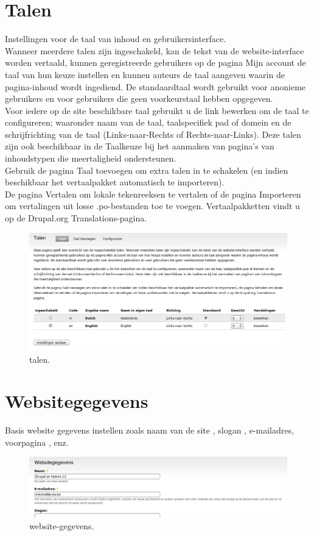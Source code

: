 \section{Talen} 
    Instellingen voor de taal van inhoud en gebruikersinterface. \\
Wanneer meerdere talen zijn 
ingeschakeld, kan de tekst van de website-interface worden vertaald, kunnen geregistreerde 
gebruikers op de pagina Mijn account de taal van hun keuze instellen en kunnen auteurs de 
taal aangeven waarin de pagina-inhoud wordt ingediend. De standaardtaal wordt gebruikt voor 
anonieme gebruikers en voor gebruikers die geen voorkeurstaal hebben opgegeven.
\\
Voor iedere op de site beschikbare taal gebruikt u de link bewerken om de taal te configureren; 
waaronder naam van de taal, taalspecifiek pad of domein en de schrijfrichting van de 
taal (Links-naar-Rechts of Rechts-naar-Links). Deze talen zijn ook beschikbaar in de 
Taalkeuze bij het aanmaken van pagina's van inhoudstypen die meertaligheid ondersteunen.
\\
Gebruik de pagina Taal toevoegen om extra talen in te schakelen (en indien beschikbaar 
het vertaalpakket automatisch te importeren).\\ De pagina Vertalen om lokale
tekenreeksen te vertalen of de pagina Importeren om vertalingen uit losse .po-bestanden toe te voegen. 
Vertaalpakketten vindt u op de Drupal.org Translations-pagina.
 \begin{figure}[!h]
    \centering
   \includegraphics[scale=0.3,angle=0]{talen}
   \caption{talen.\label{white}}
 \end{figure} 

\section{ Websitegegevens} 
    Basis website gegevens instellen zoals naam van de site ,
    slogan , e-mailadres, voorpagina , enz.
    \begin{figure}[!h]
    \centering
   \includegraphics[scale=0.3,angle=0]{website-gegevens}
   \caption{website-gegevens.\label{white}}
 \end{figure}    
    
